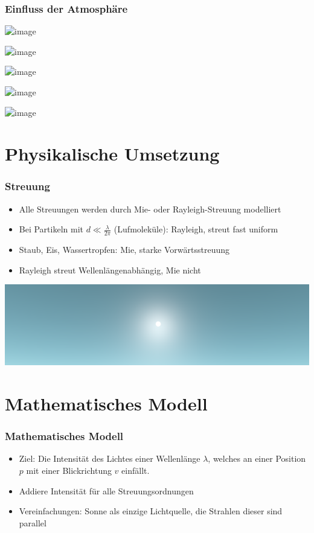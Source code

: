 \documentclass[german]{beamer}
\begin{document}
\begin{frame}
\frametitle{Einfluss der Atmosphäre}

\includegraphics<1>[scale=0.12]{nogl_noap_nosun_noat.png}

\includegraphics<2>[scale=0.12]{nogl_noap_nosun.png}

\includegraphics<3>[scale=0.12]{nogl_noap.png}

\includegraphics<4>[scale=0.12]{nogl.png}

\includegraphics<5>[scale=0.12]{full.png}

\end{frame}

\section{Physikalische Umsetzung}

\begin{frame}
\frametitle{Streuung}

\begin{itemize}
	\item Alle Streuungen werden durch Mie- oder Rayleigh-Streuung modelliert
	\item Bei Partikeln mit $d \ll \frac{\lambda}{2\pi}$ (Lufmoleküle): Rayleigh, streut fast uniform
	\item Staub, Eis, Wassertropfen: Mie, starke Vorwärtsstreuung
	\item Rayleigh streut Wellenlängenabhängig, Mie nicht
\end{itemize}

\centering
\vspace{1.7em}
\includegraphics[scale=0.2]{scattering.png}

\end{frame}

\section{Mathematisches Modell}

\begin{frame}
\frametitle{Mathematisches Modell}

\begin{itemize}
\item Ziel: Die Intensität des Lichtes einer Wellenlänge $\lambda$, welches an einer Position $p$ mit einer
Blickrichtung $v$ einfällt.
\item Addiere Intensität für alle Streuungsordnungen
\item Vereinfachungen: Sonne als einzige Lichtquelle, die Strahlen dieser sind parallel
\end{itemize}

\end{frame}
\end{document}
